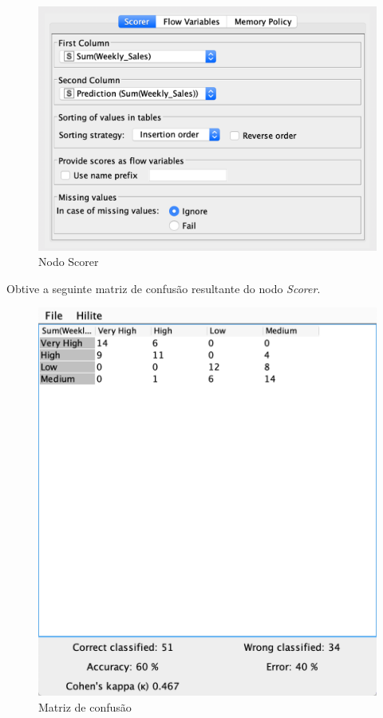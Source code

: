 \begin{figure}[H]
    \centering
    \includegraphics[scale=0.4]{Images/T3_c1.png}
    \caption{Nodo Scorer}
\end{figure}

Obtive a seguinte matriz de confusão resultante do nodo \textit{Scorer}.

\begin{figure}[H]
    \centering
    \includegraphics[scale=0.4]{Images/T3_c2.png}
    \caption{Matriz de confusão}
\end{figure}

